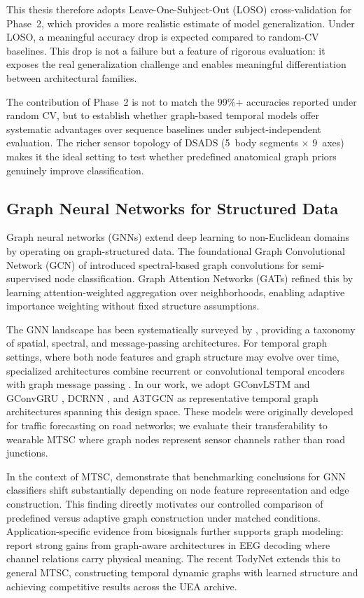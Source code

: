 \documentclass[11pt,a4paper]{article}
\begin{document}
This thesis therefore adopts Leave-One-Subject-Out (LOSO) cross-validation for Phase~2, which provides a more realistic estimate of model generalization. Under LOSO, a meaningful accuracy drop is expected compared to random-CV baselines. This drop is not a failure but a feature of rigorous evaluation: it exposes the real generalization challenge and enables meaningful differentiation between architectural families.

The contribution of Phase~2 is not to match the 99\%+ accuracies reported under random CV, but to establish whether graph-based temporal models offer systematic advantages over sequence baselines under subject-independent evaluation. The richer sensor topology of DSADS (5~body segments $\times$ 9~axes) makes it the ideal setting to test whether predefined anatomical graph priors genuinely improve classification.

\subsection{Graph Neural Networks for Structured Data}

Graph neural networks (GNNs) extend deep learning to non-Euclidean domains by operating on graph-structured data. The foundational Graph Convolutional Network (GCN) of \citet{kipf2017gcn} introduced spectral-based graph convolutions for semi-supervised node classification. Graph Attention Networks (GATs) \citep{velickovic2018gat} refined this by learning attention-weighted aggregation over neighborhoods, enabling adaptive importance weighting without fixed structure assumptions.

The GNN landscape has been systematically surveyed by \citet{wu2021gnnsurvey}, providing a taxonomy of spatial, spectral, and message-passing architectures. For temporal graph settings, where both node features and graph structure may evolve over time, specialized architectures combine recurrent or convolutional temporal encoders with graph message passing \citep{kazemi2020tgnnsurvey}. In our work, we adopt GConvLSTM and GConvGRU \citep{seo2018gcrn}, DCRNN \citep{li2018dcrnn}, and A3TGCN \citep{zhu2021a3tgcn} as representative temporal graph architectures spanning this design space. These models were originally developed for traffic forecasting on road networks; we evaluate their transferability to wearable MTSC where graph nodes represent sensor channels rather than road junctions.

In the context of MTSC, \citet{yang2025benchmarkgnn} demonstrate that benchmarking conclusions for GNN classifiers shift substantially depending on node feature representation and edge construction. This finding directly motivates our controlled comparison of predefined versus adaptive graph construction under matched conditions. Application-specific evidence from biosignals further supports graph modeling: \citet{jia2020attentiongraphresnet} report strong gains from graph-aware architectures in EEG decoding where channel relations carry physical meaning. The recent TodyNet \citep{liu2024todynet} extends this to general MTSC, constructing temporal dynamic graphs with learned structure and achieving competitive results across the UEA archive.
\end{document}
